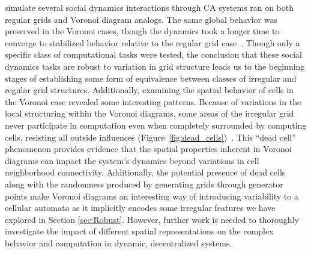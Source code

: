 \documentclass[a4paper,11pt,twoside]{report}
\begin{document}
\citeauthor{fl01} simulate several social dynamics interactions through CA systems ran on both regular grids and Voronoi diagram analogs. The same global behavior was preserved in the Voronoi cases, though the dynamics took a longer time to converge to stabilized behavior relative to the regular grid case~\cite{fl01}. Though only a specific class of computational tasks were tested, the conclusion that these social dynamics tasks are robust to variation in grid structure leads us to the beginning stages of establishing some form of equivalence between classes of irregular and regular grid structures. Additionally, examining the spatial behavior of cells in the Voronoi case revealed some interesting patterns. Because of variations in the local structuring within the Voronoi diagrams, some areas of the irregular grid never participate in computation even when completely surrounded by computing cells, resisting all outside influences (Figure~\ref{fig:dead_cells})~\cite{fl01}. This ``dead cell'' phenomenon provides evidence that the spatial properties inherent in Voronoi diagrams can impact the system's dynamics beyond variations in cell neighborhood connectivity.
Additionally, the potential presence of dead cells along with the randomness produced by generating grids through generator points make Voronoi diagrams an interesting way of introducing variability to a cellular automata as it implicitly encodes some irregular features we have explored in Section \ref{sec:Robust}. However, further work is needed to thoroughly investigate the impact of different spatial representations on the complex behavior and computation in dynamic, decentralized systems. 
\end{document}
